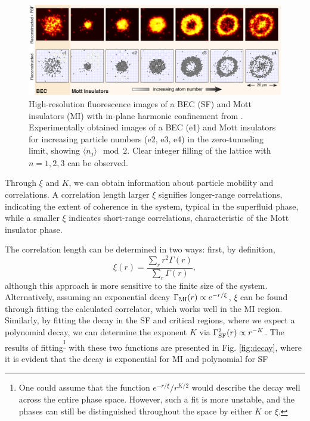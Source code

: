 \begin{figure}
    \centering
    \includegraphics[width=\textwidth]{imgs/MIexp.png}
    \caption{High-resolution fluorescence images of a BEC (SF) and Mott insulators (MI) with in-plane harmonic confinement from \cite{sherson_single-atom-resolved_2010}. Experimentally obtained images of a BEC (e1) and Mott insulators for increasing particle numbers (e2, e3, e4) in the zero-tunneling limit, showing $\langle n_j \rangle \mod 2$. Clear integer filling of the lattice with $n=1, 2, 3$ can be observed.}
    \label{fig:MIexp}
\end{figure}



Through $\xi$ and $K$, we can obtain information about particle mobility and correlations. A  correlation length larger $\xi$ signifies longer-range correlations, indicating the extent of coherence in the system, typical in the superfluid phase, while a smaller $\xi$ indicates short-range correlations, characteristic of the Mott insulator phase. 

The correlation length can be determined in two ways: first, by definition,
\begin{equation*}
	\xi(r) = \frac{\sum_r r^2 \Gamma(r)}{\sum_r \Gamma(r)},
\end{equation*}
although this approach is more sensitive to the finite size of the system. Alternatively, assuming an exponential decay $\Gamma_{\textnormal{MI}}(r) \propto e^{-r/\xi}$, $\xi$ can be found through fitting the calculated correlator, which works well in the MI region. Similarly, by fitting the decay in the SF and critical regions, where we expect a polynomial decay, we can determine the exponent $K$ via $\Gamma_{\textnormal{SF}}^2(r) \propto r^{-K}$. The results of fitting\textsuperscript{\footnote{
  One could assume that the function $e^{-r/\xi} / r^{K/2}$ would describe the decay well across the entire phase space. However, such a fit is more unstable, and the phases can still be distinguished throughout the space by either $K$ or $\xi$.
}} with these two functions are presented in Fig. \ref{fig:decay}, where it is evident that the decay is exponential for MI and polynomial for SF

